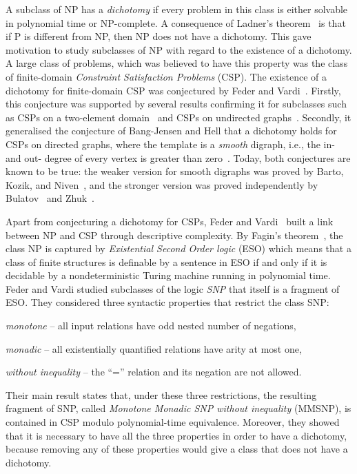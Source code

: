 \documentclass{lmcs}
\begin{document}
A subclass of NP has a \emph{dichotomy} if every problem in this class is either solvable in polynomial time or NP-complete.
%
A consequence of Ladner's theorem~\cite{ladner1975} is that if P is different from NP, then NP does not have a dichotomy.
%
This gave motivation to study subclasses of NP with regard to the existence of a dichotomy.
%
A large class of problems, which was believed to have this property was the class of finite-domain \emph{Constraint Satisfaction Problems} (CSP).
%
The existence of a dichotomy for finite-domain CSP was conjectured by Feder and Vardi~\cite{federvardi1998}.
%
Firstly, this conjecture was supported by several results confirming it for subclasses such as CSPs on a two-element domain~\cite{schaefer1978} and CSPs on undirected graphs~\cite{hellnesetril1990}.
%
Secondly, it generalised the conjecture of Bang-Jensen and Hell that a dichotomy holds for CSPs on directed graphs, where the template is a \emph{smooth} digraph, i.e., the in- and out- degree of every vertex is greater than zero~\cite{bangjensen_hell1990}.
%
Today, both conjectures are known to be true: the weaker version for smooth digraphs was proved by Barto, Kozik, and Niven~\cite{barto_kozik_niven2009}, and the stronger version was proved independently by Bulatov~\cite{bulatov2017} and Zhuk~\cite{zhuk2020}.
%

Apart from conjecturing a dichotomy for CSPs, Feder and Vardi~\cite{federvardi1998} built a link between NP and CSP through descriptive complexity.
%
By Fagin's theorem~\cite{fagin1974}, the class NP is captured by \emph{Existential Second Order logic} (ESO) which means that a class of finite structures is definable by a sentence in ESO if and only if it is decidable by a nondeterministic Turing machine running in polynomial time.
%
Feder and Vardi studied subclasses of the logic \emph{SNP} that itself is a fragment of ESO.
%
They considered three syntactic properties that restrict the class SNP:
\begin{compactitem}
\item \emph{monotone} -- all input relations have odd nested number of negations,
\item \emph{monadic} -- all existentially quantified relations have arity at most one,
\item \emph{without inequality} -- the ``='' relation and its negation are not allowed.
\end{compactitem}
%
Their main result states that, under these three restrictions, the resulting fragment of SNP, called \emph{Monotone Monadic SNP without inequality} (MMSNP), is contained in CSP modulo polynomial-time equivalence.
%
Moreover, they showed that it is necessary to have all the three properties in order to have a dichotomy, because removing any of these properties would give a class that does not have a dichotomy.
\end{document}
